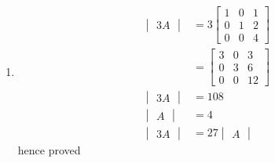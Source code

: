 \renewcommand{\theequation}{\theenumi}
\begin{enumerate}[label=\arabic*.,ref=\thesubsection.\theenumi]

\item 
\begin{align}
\begin{vmatrix}3A\end{vmatrix} &= 3\begin{bmatrix}
1 & 0 & 1 
\\
0 & 1 & 2
\\
0 & 0 & 4
\end{bmatrix} 
\\&= \begin{bmatrix}
3 & 0 & 3 
\\
0 & 3 & 6
\\
0 & 0 & 12
\end{bmatrix}
\\
\begin{vmatrix}3A\end{vmatrix} &= 108
\\
\begin{vmatrix}A\end{vmatrix} &= 4
\\
\begin{vmatrix}3A\end{vmatrix} &= 27\begin{vmatrix}A\end{vmatrix}
\end{align}
hence proved

\end{enumerate}